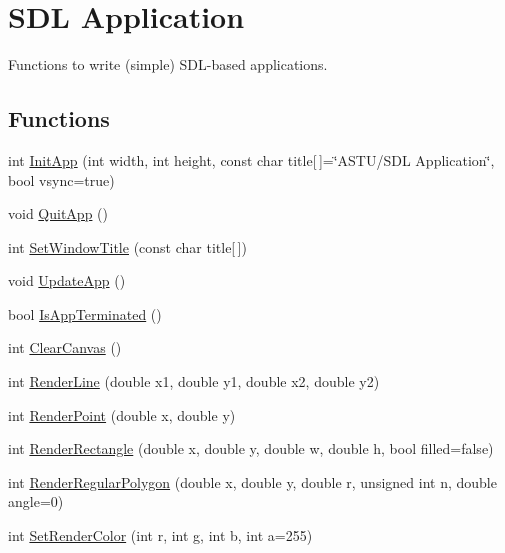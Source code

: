 \hypertarget{group__sdl__group}{}\section{S\+DL Application}
\label{group__sdl__group}


Functions to write (simple) S\+D\+L-\/based applications.  


\subsection*{Functions}
\begin{DoxyCompactItemize}
\item 
int \hyperlink{group__sdl__group_ga8f43e7993cf196bb0af33a60bc93aa75}{Init\+App} (int width, int height, const char title\mbox{[}$\,$\mbox{]}=\char`\"{}A\+S\+TU/S\+DL Application\char`\"{}, bool vsync=true)
\item 
void \hyperlink{group__sdl__group_gaf4cba1685a7c46bccc7bbdf863114cee}{Quit\+App} ()
\item 
int \hyperlink{group__sdl__group_ga6dfd8bbc85eeeee6922576be9ae65e29}{Set\+Window\+Title} (const char title\mbox{[}$\,$\mbox{]})
\item 
void \hyperlink{group__sdl__group_ga9bf9bfe01e7d336c3a3b13cc923ff850}{Update\+App} ()
\item 
bool \hyperlink{group__sdl__group_ga6d29aa641d22a0299da4710022c8c96b}{Is\+App\+Terminated} ()
\item 
int \hyperlink{group__sdl__group_ga4cc0ada571b47d2b809d441fa6766b52}{Clear\+Canvas} ()
\item 
int \hyperlink{group__sdl__group_gade420aec0a7492d5ac5f320b1ff4a814}{Render\+Line} (double x1, double y1, double x2, double y2)
\item 
int \hyperlink{group__sdl__group_gadd510400a2614b9b8fd8afbe368fc795}{Render\+Point} (double x, double y)
\item 
int \hyperlink{group__sdl__group_gaa5b815a9fcac2b1be46a5957bdbfd13f}{Render\+Rectangle} (double x, double y, double w, double h, bool filled=false)
\item 
int \hyperlink{group__sdl__group_ga639ecb3c5d86733ee9b38dcdf49c723f}{Render\+Regular\+Polygon} (double x, double y, double r, unsigned int n, double angle=0)
\item 
int \hyperlink{group__sdl__group_gab01fa8f79d94269a5b9a1cb7d2e51843}{Set\+Render\+Color} (int r, int g, int b, int a=255)
\item 

\end{DoxyCompactItemize}
